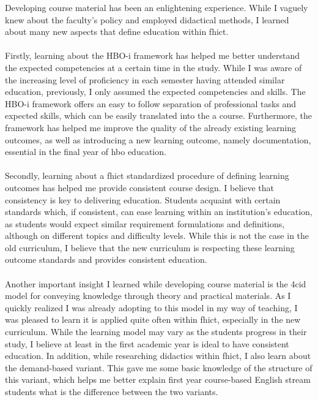 Developing course material has been an enlightening experience. 
While I vaguely knew about the faculty's policy and employed didactical methods, I learned about many new aspects that define education within \acrshort{fhict}. 
\\\\
Firstly, learning about the HBO-i framework has helped me better understand the expected competencies at a certain time in the study.
While I was aware of the increasing level of proficiency in each semester having attended similar education, previously, I only assumed the expected competencies and skills. The HBO-i framework offers an easy to follow separation of professional tasks and expected skills, which can be easily translated into the a course.  
Furthermore, the framework has helped me improve the quality of the already existing learning outcomes, as well as introducing a new learning outcome, namely documentation, essential in the final year of \acrshort{hbo} education. 
\\\\
Secondly, learning about a \acrshort{fhict} standardized procedure of defining learning outcomes has helped me provide consistent course design. 
I believe that consistency is key to delivering education. 
Students acquaint with certain standards which, if consistent, can ease learning within an institution's education, as students would expect similar requirement formulations and definitions, although on different topics and difficulty levels. 
While this is not the case in the old curriculum, I believe that the new curriculum is respecting these learning outcome standards and provides consistent education.
\\\\
Another important insight I learned while developing course material is the \acrshort{4cid} model for conveying knowledge through theory and practical materials. 
As I quickly realized I was already adopting to this model in my way of teaching, I was pleased to learn it is applied quite often within \acrshort{fhict}, especially in the new curriculum.
While the learning model may vary as the students progress in their study, I believe at least in the first academic year is ideal to have consistent education.
In addition, while researching didactics within \acrshort{fhict}, I also learn about the demand-based variant. 
This gave me some basic knowledge of the structure of this variant, which helps me better explain first year course-based English stream students what is the difference between the two variants.
